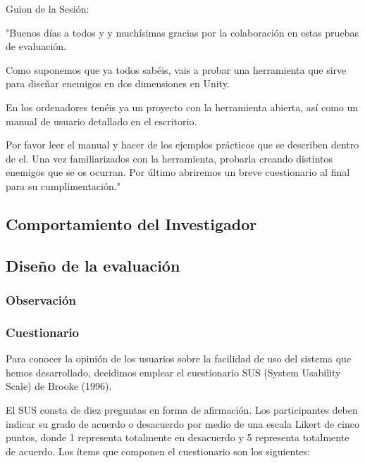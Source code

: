 Guion de la Sesión:

"Buenos días a todos y y muchísimas gracias por la colaboración en estas pruebas de evaluación.

Como suponemos que ya todos sabéis, vais a probar una herramienta que sirve para diseñar enemigos en dos dimensiones en Unity.

En los ordenadores tenéis ya un proyecto con la herramienta abierta, así como un manual de usuario detallado en el escritorio.

Por favor leer el manual y hacer de los ejemplos prácticos que se describen dentro de el. Una vez familiarizados con la herramienta, probarla creando distintos enemigos que se os ocurran.
Por último abriremos un breve cuestionario al final para su cumplimentación."
\subsection{Comportamiento del Investigador}

\subsection{Diseño de la evaluación}
 \subsubsection{Observación}
\subsubsection{Cuestionario}
Para conocer la opinión de los usuarios sobre la facilidad de uso del sistema que hemos desarrollado, decidimos emplear el cuestionario SUS (System Usability Scale) de Brooke (1996). 

El SUS consta de diez preguntas en forma de afirmación. Los participantes deben indicar su grado de acuerdo o desacuerdo por medio de una escala Likert de cinco puntos, donde 1 representa totalmente en desacuerdo y 5 representa totalmente de acuerdo. Los ítems que componen el cuestionario son los siguientes:

